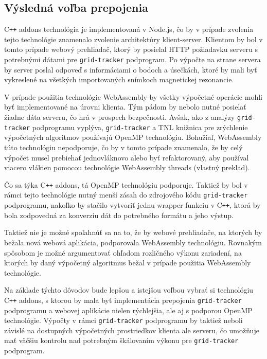 \subsection {Výsledná voľba prepojenia}
C\texttt{++} addons technológia je implementovaná v Node.js, čo by v prípade zvolenia tejto technológie znamenalo zvolenie architektúry klient-server. Klientom by bol v tomto prípade webový prehliadač, ktorý by posielal HTTP požiadavku serveru s potrebnými dátami pre \texttt{grid-tracker} podprogram. Po výpočte na strane servera by server poslal odpoveď s informáciami o bodoch a úsečkách, ktoré by mali byť vykreslené na všetkých importovaných snímkoch magnetickej rezonancie.

V prípade použitia technológie WebAssembly by všetky výpočetné operácie mohli byť implementované na úrovni klienta. Tým pádom by nebolo nutné posielať žiadne dáta serveru, čo hrá v prospech bezpečnosti. Avšak, ako z analýzy \texttt{grid-tracker} podprogramu vyplýva, \texttt{grid-tracker} a TNL knižnica pre zrýchlenie výpočetných algoritmov používajú OpenMP technológiu.
Bohužiaľ, WebAssembly túto technológiu nepodporuje, čo by v tomto prípade znamenalo, že by celý výpočet musel prebiehať jednovláknovo alebo byť refaktorovaný, aby používal viacero vlákien pomocou technológie WebAssembly threads \cite{webassembly_threads} (vlastný preklad).

Čo sa týka C\texttt{++} addons, tá OpenMP technológiu podporuje. Taktiež by bol v rámci tejto technológie nutný menší zásah do zdrojového kódu \newline \texttt{grid-tracker} podprogramu, nakoľko by stačilo vytvoriť jednu wrapper funkciu v C\texttt{++}, ktorá by bola zodpovedná za konverziu dát do potrebného formátu a jeho výstup.

Taktiež nie je možné spoľahnúť sa na to, že by webové prehliadače, na ktorých by bežala nová webová aplikácia, podporovala WebAssembly technológiu. Rovnakým spôsobom je možné argumentovať ohľadom rozličného výkonu zariadení, na ktorých by daný výpočetný algoritmus bežal v prípade použitia WebAssembly technológie.

Na základe týchto dôvodov bude lepšou a istejšou voľbou vybrať si technológiu C\texttt{++} addons, s ktorou by mala byť implementácia prepojenia \texttt{grid-tracker} podprogramu a webovej aplikácie nielen rýchlejšia, ale aj s podporou OpenMP technológie. Výpočty v rámci \texttt{grid-tracker} podprogramu by taktiež neboli závislé na dostupných výpočetných prostriedkov klienta ale serveru, čo umožňuje mať väčšiu kontrolu nad potrebným škálovaním výkonu pre \texttt{grid-tracker} podprogram.

